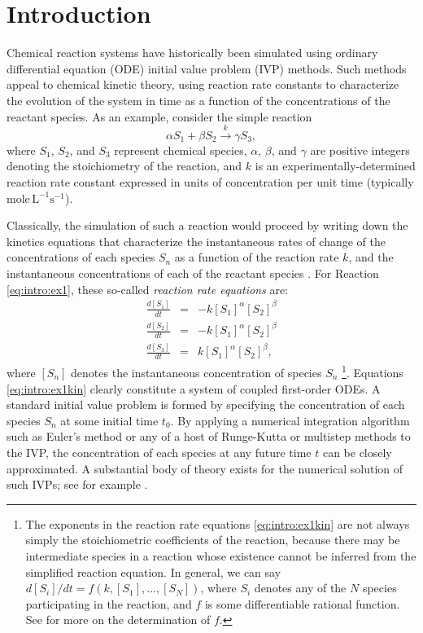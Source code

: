 \documentclass[12pt]{article}
\newcommand{\rxn}[1]{\stackrel{#1}{\longrightarrow}}
\begin{document}
\newpage
\section{Introduction}
Chemical reaction systems have historically been simulated using
ordinary differential equation (ODE) initial value problem (IVP)
methods.  Such methods appeal to chemical kinetic theory, using
reaction rate constants to characterize the evolution of the system in
time as a function of the concentrations of the reactant species.  As
an example, consider the simple reaction
\begin{equation}
  \alpha S_1 + \beta S_2 \rxn{k} \gamma S_3, \label{eq:intro:ex1}
\end{equation}
where $S_1$, $S_2$, and $S_3$ represent chemical species, $\alpha$,
$\beta$, and $\gamma$ are positive integers denoting the stoichiometry
of the reaction, and $k$ is an experimentally-determined reaction rate
constant expressed in units of concentration per unit time (typically
$\mathrm{mole}\,\mathrm{L}^{-1}\mathrm{s}^{-1}$).

Classically, the simulation of such a reaction would proceed by
writing down the kinetics equations that characterize the
instantaneous rates of change of the concentrations of each species
$S_n$ as a function of the reaction rate $k$, and the
instantaneous concentrations of each of the reactant species
\cite{oxtoby-nachtrieb-90}.  For Reaction
\ref{eq:intro:ex1}, these so-called \emph{reaction rate equations} are:
\begin{eqnarray}
  \frac{d[S_1]}{dt} &=& -k[S_1]^{\alpha}[S_2]^{\beta} \nonumber \\
  \frac{d[S_2]}{dt} &=& -k[S_1]^{\alpha}[S_2]^{\beta} \label{eq:intro:ex1kin} \\
  \frac{d[S_3]}{dt} &=& k[S_1]^{\alpha}[S_2]^{\beta},  \nonumber
\end{eqnarray}
where $[S_n]$ denotes the instantaneous concentration of species
$S_n$ \footnote{The exponents in the reaction rate equations
\eqref{eq:intro:ex1kin} are not always simply the stoichiometric
coefficients of the reaction, because there may be intermediate
species in a reaction whose existence cannot be inferred from the
simplified reaction equation.  In general, we can say $d[S_i]/dt =
f(k, [S_1], \ldots, [S_N])$, where $S_i$ denotes any of the $N$
species participating in the reaction, and $f$ is some differentiable
rational function.  See \cite{oxtoby-nachtrieb-90} for more on the
determination of $f$.}.  Equations \eqref{eq:intro:ex1kin} clearly
constitute a system of coupled first-order ODEs. A standard
initial value problem is formed by specifying the concentration of
each species $S_n$ at some initial time $t_0$.  By applying a
numerical integration algorithm such as Euler's method or any of a
host of Runge-Kutta or multistep methods to the IVP, the concentration
of each species at any future time $t$ can be closely approximated.  A
substantial body of theory exists for the numerical solution of such
IVPs; see for example \cite{ascher-petzold}.
\end{document}
